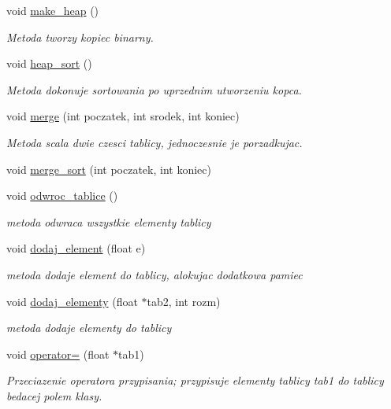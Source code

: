 \begin{DoxyCompactItemize}
void \hyperlink{classoperacje_ae752685beea6c7ee81d2347a98d40146}{make\-\_\-heap} ()
\begin{DoxyCompactList}\small\item\em \-Metoda tworzy kopiec binarny. \end{DoxyCompactList}\item 
void \hyperlink{classoperacje_aec9d2248eb072f97da794ee4c9b99a5d}{heap\-\_\-sort} ()
\begin{DoxyCompactList}\small\item\em \-Metoda dokonuje sortowania po uprzednim utworzeniu kopca. \end{DoxyCompactList}\item 
void \hyperlink{classoperacje_ad766f1d18595ff6b779485528c65d3f0}{merge} (int poczatek, int srodek, int koniec)
\begin{DoxyCompactList}\small\item\em \-Metoda scala dwie czesci tablicy, jednoczesnie je porzadkujac. \end{DoxyCompactList}\item 
void \hyperlink{classoperacje_ac65f2613b7d32b4f95e59bf2f8fd1aab}{merge\-\_\-sort} (int poczatek, int koniec)
\item 
void \hyperlink{classoperacje_aedc47c87f4f44f8af0cba64a940a5333}{odwroc\-\_\-tablice} ()
\begin{DoxyCompactList}\small\item\em metoda odwraca wszystkie elementy tablicy \end{DoxyCompactList}\item 
void \hyperlink{classoperacje_ad8397efded792c1381bfd0292b3e91b6}{dodaj\-\_\-element} (float e)
\begin{DoxyCompactList}\small\item\em metoda dodaje element do tablicy, alokujac dodatkowa pamiec \end{DoxyCompactList}\item 
void \hyperlink{classoperacje_a933533caa39434db543aca704804625c}{dodaj\-\_\-elementy} (float $\ast$tab2, int rozm)
\begin{DoxyCompactList}\small\item\em metoda dodaje elementy do tablicy \end{DoxyCompactList}\item 
void \hyperlink{classoperacje_a33127b613894949faba7a04f23075bf8}{operator=} (float $\ast$tab1)
\begin{DoxyCompactList}\small\item\em \-Przeciazenie operatora przypisania; przypisuje elementy tablicy {\ttfamily tab1} {\ttfamily do} tablicy bedacej polem klasy. \end{DoxyCompactList}\item 

\end{DoxyCompactItemize}
